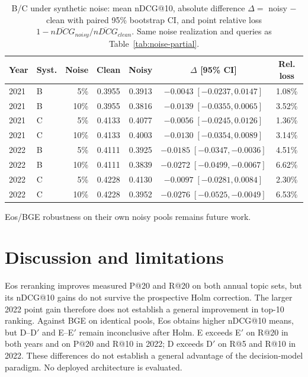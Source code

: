 \documentclass{article}
\begin{document}
\begin{table}[t]
  \caption{B/C under synthetic noise: mean nDCG@10, absolute difference $\Delta =$ noisy $-$ clean with paired 95\% bootstrap CI, and point relative loss $1-\overline{nDCG}_{noisy}/\overline{nDCG}_{clean}$. Same noise realization and queries as Table~\ref{tab:noise-partial}.}
  \label{tab:noise-semantic}
  \centering
  \small
  \begin{tabular}{llrcccc}
    \toprule
    Year & Syst. & Noise & Clean & Noisy & $\Delta$ [95\% CI] & Rel. loss \\
    \midrule
    2021 & B & 5\% & 0.3955 & 0.3913 & $-0.0043\;[-0.0237, 0.0147]$ & 1.08\% \\
    2021 & B & 10\% & 0.3955 & 0.3816 & $-0.0139\;[-0.0355, 0.0065]$ & 3.52\% \\
    2021 & C & 5\% & 0.4133 & 0.4077 & $-0.0056\;[-0.0245, 0.0126]$ & 1.36\% \\
    2021 & C & 10\% & 0.4133 & 0.4003 & $-0.0130\;[-0.0354, 0.0089]$ & 3.14\% \\
    \midrule
    2022 & B & 5\% & 0.4111 & 0.3925 & $-0.0185\;[-0.0347, -0.0036]$ & 4.51\% \\
    2022 & B & 10\% & 0.4111 & 0.3839 & $-0.0272\;[-0.0499, -0.0067]$ & 6.62\% \\
    2022 & C & 5\% & 0.4228 & 0.4130 & $-0.0097\;[-0.0281, 0.0084]$ & 2.30\% \\
    2022 & C & 10\% & 0.4228 & 0.3952 & $-0.0276\;[-0.0525, -0.0049]$ & 6.53\% \\
    \bottomrule
  \end{tabular}
\end{table}

Eos/BGE robustness on their own noisy pools remains future work.

\section{Discussion and limitations}
\label{sec:discussion}

Eos reranking improves measured P@20 and R@20 on both annual topic sets, but its nDCG@10 gains do not survive the prospective Holm correction. The larger 2022 point gain therefore does not establish a general improvement in top-10 ranking. Against BGE on identical pools, Eos obtains higher nDCG@10 means, but D--D$'$ and E--E$'$ remain inconclusive after Holm. E exceeds E$'$ on R@20 in both years and on P@20 and R@10 in 2022; D exceeds D$'$ on R@5 and R@10 in 2022. These differences do not establish a general advantage of the decision-model paradigm. No deployed architecture is evaluated.
\end{document}
